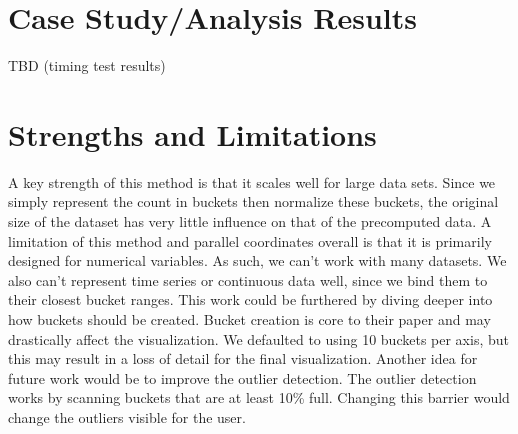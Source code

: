 \documentclass[	DIV=calc,%
			paper=a4,%
			fontsize=11pt,%
			twocolumn]{scrartcl}					%
\begin{document}
\section {Case Study/Analysis Results}
TBD (timing test results)

\section {Strengths and Limitations}
A key strength of this method is that it scales well for large data sets. Since we simply represent the count in buckets then normalize these buckets, the original size of the dataset has very little influence on that of the precomputed data. 
A limitation of this method and parallel coordinates overall is that it is primarily designed for numerical variables. As such, we can’t work with many datasets. We also can’t represent time series or continuous data well, since we bind them to their closest bucket ranges. 
This work could be furthered by diving deeper into how buckets should be created. Bucket creation is core to their paper and may drastically affect the visualization. We defaulted to using 10 buckets per axis, but this may result in a loss of detail for the final visualization. 
Another idea for future work would be to improve the outlier detection. The outlier detection works by scanning buckets that are at least 10\% full. Changing this barrier would change the outliers visible for the user. 




\end{document}
